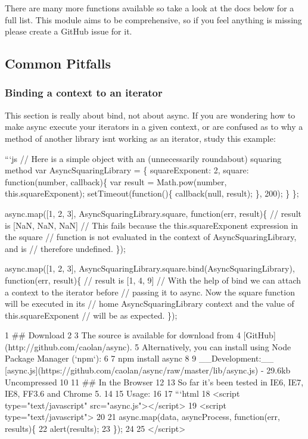 There are many more functions available so take a look at the docs below for a full list. This module aims to be comprehensive, so if you feel anything is missing please create a Git\+Hub issue for it.

\subsection*{Common Pitfalls}

\subsubsection*{Binding a context to an iterator}

This section is really about {\ttfamily bind}, not about {\ttfamily async}. If you are wondering how to make {\ttfamily async} execute your iterators in a given context, or are confused as to why a method of another library isn\textquotesingle{}t working as an iterator, study this example\+:

```js // Here is a simple object with an (unnecessarily roundabout) squaring method var Async\+Squaring\+Library = \{ square\+Exponent\+: 2, square\+: function(number, callback)\{ var result = Math.\+pow(number, this.\+square\+Exponent); set\+Timeout(function()\{ callback(null, result); \}, 200); \} \};

async.\+map(\mbox{[}1, 2, 3\mbox{]}, Async\+Squaring\+Library.\+square, function(err, result)\{ // result is \mbox{[}Na\+N, Na\+N, Na\+N\mbox{]} // This fails because the {\ttfamily this.\+square\+Exponent} expression in the square // function is not evaluated in the context of Async\+Squaring\+Library, and is // therefore undefined. \});

async.\+map(\mbox{[}1, 2, 3\mbox{]}, Async\+Squaring\+Library.\+square.\+bind(\+Async\+Squaring\+Library), function(err, result)\{ // result is \mbox{[}1, 4, 9\mbox{]} // With the help of bind we can attach a context to the iterator before // passing it to async. Now the square function will be executed in its // \textquotesingle{}home\textquotesingle{} Async\+Squaring\+Library context and the value of {\ttfamily this.\+square\+Exponent} // will be as expected. \}); 
\begin{DoxyCode}
1 ## Download
2 
3 The source is available for download from
4 [GitHub](http://github.com/caolan/async).
5 Alternatively, you can install using Node Package Manager (`npm`):
6 
7     npm install async
8 
9 \_\_Development:\_\_ [async.js](https://github.com/caolan/async/raw/master/lib/async.js) - 29.6kb Uncompressed
10 
11 ## In the Browser
12 
13 So far it's been tested in IE6, IE7, IE8, FF3.6 and Chrome 5. 
14 
15 Usage:
16 
17 ```html
18 <script type="text/javascript" src="async.js"></script>
19 <script type="text/javascript">
20 
21     async.map(data, asyncProcess, function(err, results)\{
22         alert(results);
23     \});
24 
25 </script>
\end{DoxyCode}


